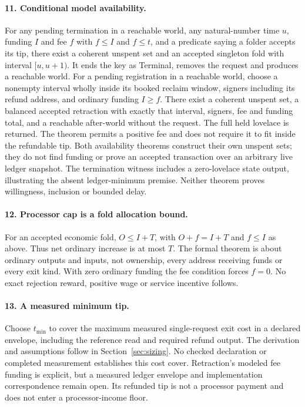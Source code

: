 \paragraph{11. Conditional model availability.}
\checked For any pending termination in a reachable world, any natural-number
time $u$, funding $I$ and fee $f$ with $f\le I$ and $f\le t$, and a predicate
saying a folder accepts its tip, there exist a coherent unspent set and an
accepted singleton fold with interval $[u,u+1)$. It ends the key as Terminal,
removes the request and produces a reachable world.
\checked For a pending registration in a reachable world, choose a nonempty
interval wholly inside its booked reclaim window, signers including its
refund address, and ordinary funding $I\ge f$. There exist a coherent unspent
set, a balanced accepted retraction with exactly that interval, signers, fee
and funding total, and a reachable after-world without the request. The full
held lovelace is returned. The theorem permits a positive fee and does not
require it to fit inside the refundable tip.
\missing Both availability theorems construct their own unspent sets; they
do not find funding or prove an accepted transaction over an arbitrary live
ledger snapshot. The termination witness includes a zero-lovelace state output,
illustrating the absent ledger-minimum premise. Neither theorem proves
willingness, inclusion or bounded delay.

\paragraph{12. Processor cap is a fold allocation bound.}
\checked For an accepted economic fold, $O\le I+T$, with
$O+f=I+T$ and $f\le I$ as above.
\hand Thus net ordinary increase is at most $T$. The formal theorem is about
ordinary outputs and inputs, not ownership, every address receiving funds or
every exit kind. With zero ordinary funding the fee condition forces $f=0$.
No exact rejection reward, positive wage or service incentive follows.

\paragraph{13. A measured minimum tip.}
\proposed Choose $t_{\min}$ to cover the maximum measured single-request exit
cost in a declared envelope, including the reference read and required refund
output. The derivation and assumptions follow in Section~\ref{sec:sizing}.
\missing No checked declaration or completed measurement establishes this
cost cover. Retraction's modeled fee funding is explicit, but a measured
ledger envelope and implementation correspondence remain open. Its refunded
tip is not a processor payment and does not enter a processor-income floor.

